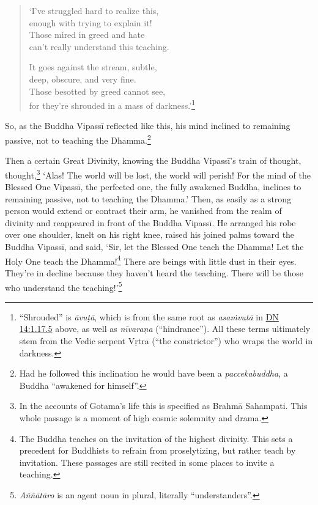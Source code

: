 \documentclass[12pt,openany]{book}%
\begin{document}
\begin{verse}%
‘I’ve struggled hard to realize this, \\
enough with trying to explain it! \\
Those mired in greed and hate \\
can’t really understand this teaching. 

It goes against the stream, subtle, \\
deep, obscure, and very fine. \\
Those besotted by greed cannot see, \\
for they’re shrouded in a mass of darkness.’\footnote{“Shrouded” is \textit{\textsanskrit{āvuṭā}}, which is from the same root as \textit{\textsanskrit{asaṁvutā}} in \href{https://suttacentral.net/dn14/en/sujato\#1.17.5}{DN 14:1.17.5} above, as well as \textit{\textsanskrit{nīvaraṇa}} (“hindrance”). All these terms ultimately stem from the Vedic serpent \textsanskrit{Vṛtra} (“the constrictor”) who wraps the world in darkness. } 

%
\end{verse}

So, as the Buddha \textsanskrit{Vipassī} reflected like this, his mind inclined to remaining passive, not to teaching the Dhamma.\footnote{Had he followed this inclination he would have been a \textit{paccekabuddha}, a Buddha “awakened for himself”. } 

Then a certain Great Divinity, knowing the Buddha \textsanskrit{Vipassī}’s train of thought, thought,\footnote{In the accounts of Gotama’s life this is specified as \textsanskrit{Brahmā} Sahampati. This whole passage is a moment of high cosmic solemnity and drama. } ‘Alas! The world will be lost, the world will perish! For the mind of the Blessed One \textsanskrit{Vipassī}, the perfected one, the fully awakened Buddha, inclines to remaining passive, not to teaching the Dhamma.’ Then, as easily as a strong person would extend or contract their arm, he vanished from the realm of divinity and reappeared in front of the Buddha \textsanskrit{Vipassī}. He arranged his robe over one shoulder, knelt on his right knee, raised his joined palms toward the Buddha \textsanskrit{Vipassī}, and said, ‘Sir, let the Blessed One teach the Dhamma! Let the Holy One teach the Dhamma!\footnote{The Buddha teaches on the invitation of the highest divinity. This sets a precedent for Buddhists to refrain from proselytizing, but rather teach by invitation. These passages are still recited in some places to invite a teaching. } There are beings with little dust in their eyes. They’re in decline because they haven’t heard the teaching. There will be those who understand the teaching!’\footnote{\textit{\textsanskrit{Aññātāro}} is an agent noun in plural, literally “understanders”. } 
\end{document}
